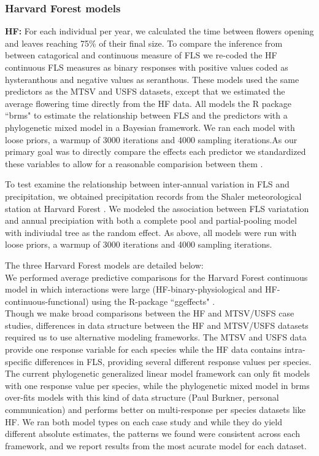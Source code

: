\documentclass[12pt]{article}\usepackage[]{graphicx}\usepackage[]{color}
\begin{document}
\subsubsection*{Harvard Forest models}
\indent \textbf{HF:} For each individual per year, we calculated the time between flowers opening and leaves reaching 75\% of their final size. To compare the inference from between catagorical and continuous measure of FLS we re-coded the HF continuous FLS measures as binary responses with positive values coded as hysteranthous and negative values as seranthous. These models used the same predictors as the MTSV and USFS datasets, except that we estimated the average flowering time directly from the HF data. All models the R package ``brms" \citep{Burkner2018} to estimate the relationship between FLS and the predictors with a phylogenetic mixed model in a Bayesian framework. We ran each model with loose priors, a warmup of 3000 iterations and 4000 sampling iterations.As our primary goal was to directly compare the effects each predictor we standardized these variables to allow for a reasonable comparision between them \emph{\citep{Gelman2006}}. 


To test examine the relationship between inter-annual variation in FLS and precipitation, we obtained precipitation records from the Shaler meteorological station at Harvard Forest \citep{}. We modeled the association between FLS variatation and annual precipiation with both a complete pool and partial-pooling model with indiviudal tree as the random effect. As above, all models were run with loose priors, a warmup of 3000 iterations and 4000 sampling iterations.


\indent  The three Harvard Forest models are detailed below:\\


\indent We performed average predictive comparisons for the Harvard Forest continuous model in which interactions were large (HF-binary-physiological and HF-continuous-functional) using the R-package ``ggeffects" \citep{Ludecke2018}.\\

\indent Though we make broad comparisons between the HF and MTSV/USFS case studies, differences in data structure between the HF  and MTSV/USFS datasets required us to use alternative modeling frameworks. The MTSV and USFS data provide one response variable for each species while the HF data contains intra-specific differences in FLS, providing several different response values per species. The current phylogenetic generalized linear model framework can only fit models with one response value per species, while the phylogenetic mixed model in brms over-fits models with this kind of data structure (Paul Burkner, personal communication) and performs better on multi-response per species datasets like HF. We ran both model types on each case study and while they do yield different absolute estimates, the patterns we found were consistent across each framework, and we report results from the most acurate model for each dataset.\\
\end{document}

